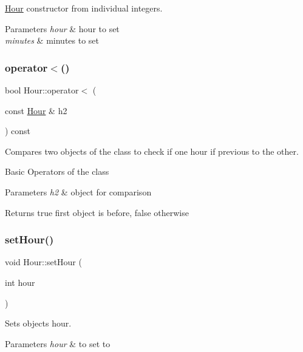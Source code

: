 \hyperlink{class_hour}{Hour} constructor from individual integers. 


\begin{DoxyParams}{Parameters}
{\em hour} & hour to set \\
\hline
{\em minutes} & minutes to set \\
\hline
\end{DoxyParams}
\mbox{\label{group___hour_ga998bef44d3ea319e70f9d88ad053563b}} 
\subsubsection{\texorpdfstring{operator$<$()}{operator<()}}
{\footnotesize\ttfamily bool Hour\+::operator$<$ (\begin{DoxyParamCaption}\item[{const \hyperlink{class_hour}{Hour} \&}]{h2 }\end{DoxyParamCaption}) const}



Compares two objects of the class to check if one hour if previous to the other. 

Basic Operators of the class 
\begin{DoxyParams}{Parameters}
{\em h2} & object for comparison\\
\hline
\end{DoxyParams}
\begin{DoxyReturn}{Returns}
true first object is before, false otherwise 
\end{DoxyReturn}
\mbox{\label{group___hour_ga62d4e3da6eeefecab589a63160493835}} 
\subsubsection{\texorpdfstring{set\+Hour()}{setHour()}}
{\footnotesize\ttfamily void Hour\+::set\+Hour (\begin{DoxyParamCaption}\item[{int}]{hour }\end{DoxyParamCaption})}



Sets object\textquotesingle{}s hour. 


\begin{DoxyParams}{Parameters}
{\em hour} & to set to \\
\hline
\end{DoxyParams}
\mbox{\label{group___hour_gab3606a7c5dd8679a44e79536a491923e}} 
